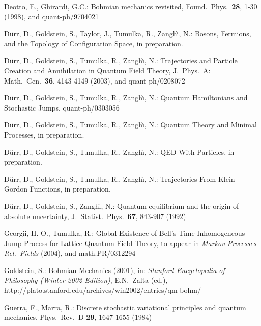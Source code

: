 \documentclass[12pt]{article}
\newcommand{\1}{\mathbf{1}} %
\begin{document}
\begin{thebibliography}{28.}
 Deotto, E., Ghirardi, G.C.: Bohmian mechanics
   revisited, Found.\ Phys.\ \textbf{28}, 1-30 (1998), and
   quant-ph/9704021



 D\"urr, D., Goldstein, S., Taylor, J., Tumulka,
   R., Zangh{\`\i}, N.: Bosons, Fermions, and the Topology of
   Configuration Space, in preparation.

 D\"urr, D., Goldstein, S., Tumulka, R., Zangh{\`\i},
   N.: Trajectories and Particle Creation and Annihilation in Quantum
   Field Theory, J.\ Phys.\ A: Math.\ Gen.\ \textbf{36}, 4143-4149
   (2003), and quant-ph/0208072

 D\"urr, D., Goldstein, S., Tumulka, R., Zangh{\`\i},
   N.: Quantum Hamiltonians and Stochastic Jumps, quant-ph/0303056

 D\"urr, D., Goldstein, S., Tumulka, R., Zangh{\`\i},
   N.: Quantum Theory and Minimal Processes, in preparation.

 D\"urr, D., Goldstein, S., Tumulka, R., Zangh{\`\i},
   N.: QED With Particles, in preparation.

 D\"urr, D., Goldstein, S., Tumulka, R., Zangh{\`\i},
   N.: Trajectories From Klein--Gordon Functions, in preparation.

 D\"urr, D., Goldstein, S., Zangh{\`\i}, N.: Quantum
   equilibrium and the origin of absolute uncertainty, J.\ Statist.\
   Phys.\ \textbf{67}, 843-907 (1992)

 Georgii, H.-O., Tumulka, R.: Global Existence of Bell's
   Time-Inhomogeneous Jump Process for Lattice Quantum Field Theory, to
   appear in \textit{Markov Processes Rel.\ Fields} (2004), and
   math.PR/0312294

 Goldstein, S.: Bohmian Mechanics (2001), in:
   \textit{Stanford Encyclopedia of Philosophy (Winter 2002 Edition)},
   E.N.~Zalta (ed.), \newline
   http://plato.stanford.edu/archives/win2002/entries/qm-bohm/

 Guerra, F., Marra, R.: Discrete stochastic
   variational principles and quantum mechanics, Phys.~Rev.~D
   \textbf{29}, 1647-1655 (1984)


\end{thebibliography}
\end{document}
